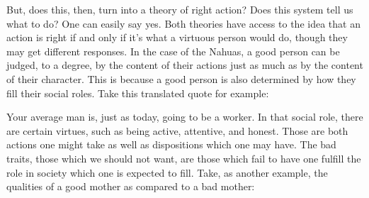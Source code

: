 But, does this, then, turn into a theory of right action? Does this system tell us what to do? One can easily say yes. Both theories have access to the idea that an action is right if and only if it's what a virtuous person would do, though they may get different responses. In the case of the Nahuas, a good person can be judged, to a degree, by the content of their actions just as much as by the content of their character. This is because a good person is also determined by how they fill their social roles. Take this translated quote for example:


Your average man is, just as today, going to be a worker. In that social role, there are certain virtues, such as being active, attentive, and honest. Those are both actions one might take as well as dispositions which one may have. The bad traits, those which we should not want, are those which fail to have one fulfill the role in society which one is expected to fill. Take, as another example, the qualities of a good mother as compared to a bad mother: 


